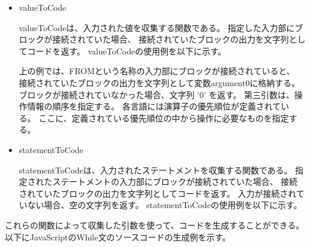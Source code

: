\documentclass{risepaper}
\begin{document}
\begin{itemize}
\item valueToCode

valueToCodeは、入力された値を収集する関数である。
指定した入力部にブロックが接続されていた場合、
接続されていたブロックの出力を文字列としてコードを返す。
valueToCodeの使用例を以下に示す。


上の例では、FROMという名称の入力部にブロックが接続されていると、
接続されていたブロックの出力を文字列として変数argument0に格納する。
ブロックが接続されていなかった場合、文字列 '0' を返す。
第三引数は、操作情報の順序を指定する。
各言語には演算子の優先順位が定義されている。
ここに、定義されている優先順位の中から操作に必要なものを指定する。

\end{itemize}

\begin{itemize}
\item statementToCode

statementToCodeは、入力されたステートメントを収集する関数である。
指定されたステートメントの入力部にブロックが接続されていた場合、
接続されていたブロックの出力を文字列としてコードを返す。
入力が接続されていない場合、空の文字列を返す。
statementToCodeの使用例を以下に示す。


\end{itemize}


これらの関数によって収集した引数を使って、コードを生成することができる。
以下にJavaScriptのWhile文のソースコードの生成例を示す。

\end{document}
